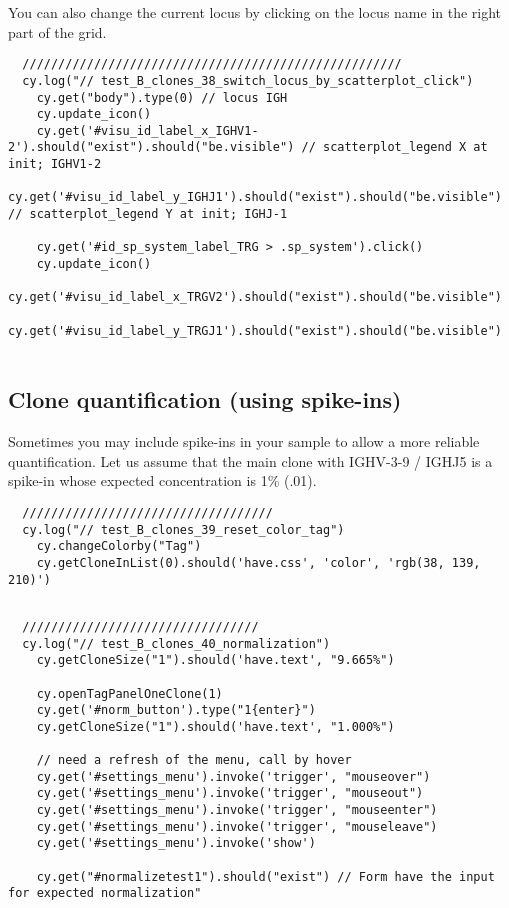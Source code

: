 You can also change the current locus by clicking on the locus name in the
right part of the grid.
\begin{verbatim}
  /////////////////////////////////////////////////////
  cy.log("// test_B_clones_38_switch_locus_by_scatterplot_click")
    cy.get("body").type(0) // locus IGH
    cy.update_icon()
    cy.get('#visu_id_label_x_IGHV1-2').should("exist").should("be.visible") // scatterplot_legend X at init; IGHV1-2
    cy.get('#visu_id_label_y_IGHJ1').should("exist").should("be.visible")   // scatterplot_legend Y at init; IGHJ-1

    cy.get('#id_sp_system_label_TRG > .sp_system').click()
    cy.update_icon()
    cy.get('#visu_id_label_x_TRGV2').should("exist").should("be.visible")
    cy.get('#visu_id_label_y_TRGJ1').should("exist").should("be.visible")


\end{verbatim}

\subsection{Clone quantification (using spike-ins)}

Sometimes you may include spike-ins in your sample to allow a more reliable
quantification.
Let us assume that the main clone with IGHV-3-9 / IGHJ5 is a spike-in whose
expected concentration is 1\% (.01).

\begin{verbatim}
  ///////////////////////////////////
  cy.log("// test_B_clones_39_reset_color_tag")
    cy.changeColorby("Tag")
    cy.getCloneInList(0).should('have.css', 'color', 'rgb(38, 139, 210)')


\end{verbatim}

\begin{verbatim}
  /////////////////////////////////
  cy.log("// test_B_clones_40_normalization")
    cy.getCloneSize("1").should('have.text', "9.665%")

    cy.openTagPanelOneClone(1)
    cy.get('#norm_button').type("1{enter}")
    cy.getCloneSize("1").should('have.text', "1.000%")

    // need a refresh of the menu, call by hover
    cy.get('#settings_menu').invoke('trigger', "mouseover")
    cy.get('#settings_menu').invoke('trigger', "mouseout")
    cy.get('#settings_menu').invoke('trigger', "mouseenter")
    cy.get('#settings_menu').invoke('trigger', "mouseleave")
    cy.get('#settings_menu').invoke('show')

    cy.get("#normalizetest1").should("exist") // Form have the input for expected normalization"


\end{verbatim}

